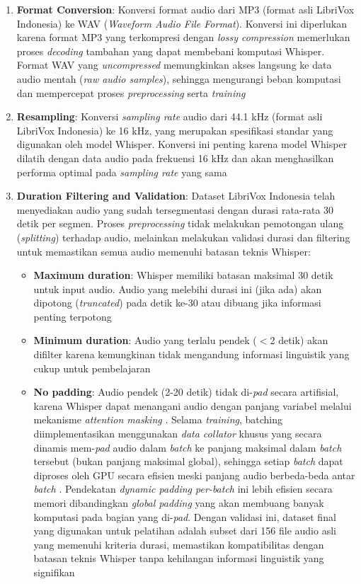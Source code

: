 \begin{enumerate}[noitemsep]
    \item \textbf{Format Conversion}: Konversi format audio dari MP3 (format asli LibriVox Indonesia) ke WAV (\textit{Waveform Audio File Format}). Konversi ini diperlukan karena format MP3 yang terkompresi dengan \textit{lossy compression} memerlukan proses \textit{decoding} tambahan yang dapat membebani komputasi Whisper. Format WAV yang \textit{uncompressed} memungkinkan akses langsung ke data audio mentah (\textit{raw audio samples}), sehingga mengurangi beban komputasi dan mempercepat proses \textit{preprocessing} serta \textit{training} \cite{mcfee2015librosa}
    \item \textbf{Resampling}: Konversi \textit{sampling rate} audio dari 44.1 kHz (format asli LibriVox Indonesia) ke 16 kHz, yang merupakan spesifikasi standar yang digunakan oleh model Whisper. Konversi ini penting karena model Whisper dilatih dengan data audio pada frekuensi 16 kHz dan akan menghasilkan performa optimal pada \textit{sampling rate} yang sama \cite{radford2023whisper}
    \item \textbf{Duration Filtering and Validation}: Dataset LibriVox Indonesia telah menyediakan audio yang sudah tersegmentasi dengan durasi rata-rata 30 detik per segmen. Proses \textit{preprocessing} tidak melakukan pemotongan ulang (\textit{splitting}) terhadap audio, melainkan melakukan validasi durasi dan filtering untuk memastikan semua audio memenuhi batasan teknis Whisper:
    \begin{itemize}[noitemsep]
        \item \textbf{Maximum duration}: Whisper memiliki batasan maksimal 30 detik untuk input audio. Audio yang melebihi durasi ini (jika ada) akan dipotong (\textit{truncated}) pada detik ke-30 atau dibuang jika informasi penting terpotong \cite{radford2023whisper}
        \item \textbf{Minimum duration}: Audio yang terlalu pendek ($<$2 detik) akan difilter karena kemungkinan tidak mengandung informasi linguistik yang cukup untuk pembelajaran
        \item \textbf{No padding}: Audio pendek (2-20 detik) tidak di-\textit{pad} secara artifisial, karena Whisper dapat menangani audio dengan panjang variabel melalui mekanisme \textit{attention masking} \cite{vaswani2017attention,radford2023whisper}. Selama \textit{training}, batching diimplementasikan menggunakan \textit{data collator} khusus yang secara dinamis mem-\textit{pad} audio dalam \textit{batch} ke panjang maksimal dalam \textit{batch} tersebut (bukan panjang maksimal global), sehingga setiap \textit{batch} dapat diproses oleh GPU secara efisien meski panjang audio berbeda-beda antar \textit{batch} \cite{wolf2020transformers}. Pendekatan \textit{dynamic padding per-batch} ini lebih efisien secara memori dibandingkan \textit{global padding} yang akan membuang banyak komputasi pada bagian yang di-\textit{pad}. Dengan validasi ini, dataset final yang digunakan untuk pelatihan adalah subset dari 156 file audio asli yang memenuhi kriteria durasi, memastikan kompatibilitas dengan batasan teknis Whisper tanpa kehilangan informasi linguistik yang signifikan
    \end{itemize}
    

\end{enumerate}

